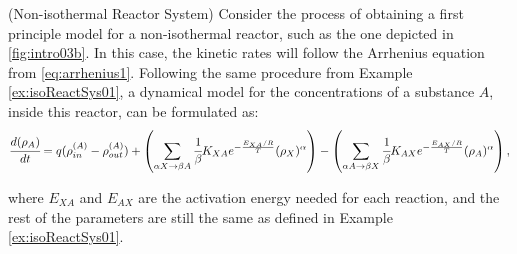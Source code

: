 \documentclass[a4paper,11pt]{book}
\numberwithin{figure}{chapter}
\numberwithin{equation}{chapter}
\numberwithin{table}{chapter}
\theoremstyle{definition}
\newtheorem{example}{Example}[chapter]
\newcounter{boxed-theorem}
\newcounter{boxed-lemma}
\newcounter{boxed-definition}
\newcounter{boxed-example}
\newenvironment{boxed-example}[1]
{\colorlet{shadecolor}{pastelRed!15} \begin{shaded} \begin{example}{#1}}
{\end{example} \end{shaded}}
\begin{document}
\begin{boxed-example}{(Non-isothermal Reactor System)} \label{ex:exoReactSys01}
    Consider the process of obtaining a first principle model for a non-isothermal reactor, such as the one depicted in \ref{fig:intro03b}. In this case, the kinetic rates will follow the Arrhenius equation from \eqref{eq:arrhenius1}. Following the same procedure from Example \ref{ex:isoReactSys01}, a dynamical model for the concentrations of a substance $A$, inside this reactor, can be formulated as: 
    \begin{equation} \label{eq:exoModel1}
            \cfrac{d (\rho_A)}{dt} = q (\rho^{(A)}_{in} - \rho^{(A)}_{out}) + \left( \sum_{\alpha X \rightarrow \beta A} \cfrac{1}{\beta} K_{XA} e^{-\frac{E_{XA}/R}{T}} (\rho_X)^{\alpha} \right) - \left(\sum_{\alpha A \rightarrow \beta X} \cfrac{1}{\beta} K_{AX} e^{-\frac{E_{AX}/R}{T}} (\rho_A)^{\alpha} \right)
    ,\end{equation}

    \noindent where $E_{XA}$ and $E_{AX}$ are the activation energy needed for each reaction, and the rest of the parameters are still the same as defined in Example \ref{ex:isoReactSys01}.  
    

\end{boxed-example}
\end{document}
